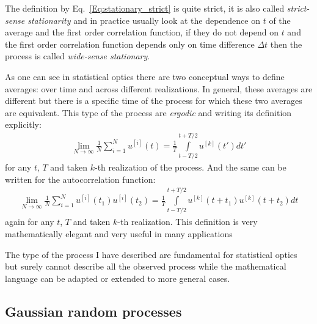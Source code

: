     The definition by Eq.~\ref{Eq:stationary_strict} is quite strict, it is also called \textit{strict-sense stationarity} and in practice usually look at the dependence on $t$ of the average and the first order correlation function, if they do not depend on $t$ and the first order correlation function depends only on time difference  $\Delta t$ then the process is called \textit{wide-sense stationary}.

    As one can see in statistical optics there are two conceptual ways to define averages: over time and across different realizations. In general, these averages are different but there is a specific time of the process for which these two averages are equivalent. This type of the process are \textit{ergodic} and writing its definition explicitly:
    \begin{align}
        \lim_{N\to\infty} \frac{1}{N}\sum_{i=1}^{N} u^{[i]}(t) = \frac{1}{T} \int \limits_{t - T/2}^{t + T/2}  u^{[k]}(t') dt'
    \end{align} 
    for any $t$, $T$ and taken $k$-th realization of the process. And the same can be written for the autocorrelation function:
    \begin{align}
        \lim_{N\to\infty} \frac{1}{N}\sum_{i=1}^{N} u^{[i]}(t_1)u^{[i]}(t_2) = \frac{1}{T} \int \limits_{t - T/2}^{t + T/2} u^{[k]}(t + t_1)u^{[k]}(t + t_2)dt
    \end{align}
    again for any $t$, $T$ and taken $k$-th realization. This definition is very mathematically elegant and very useful in many applications 

    The type of the process I have described are fundamental for statistical optics but surely cannot describe all the observed process while the mathematical language can be adapted or extended to more general cases. 

    \subsection{Gaussian random processes}

